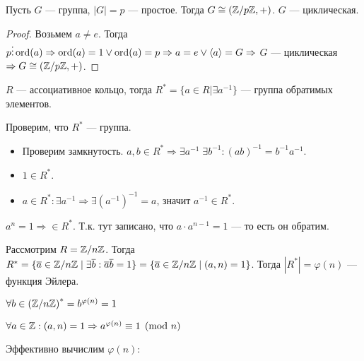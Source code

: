 \begin{remark}
    Пусть $G$ --- группа,  $|G| = p$ --- простое. Тогда  $G \cong (\mathbb{Z} / p\mathbb{Z}, +)$.  $G$ --- циклическая.
\end{remark}
\begin{proof}
    Возьмем $a \neq e$. Тогда  $p \vdots \operatorname{ord}(a) \Rightarrow \operatorname{ord}(a) = 1 \lor \operatorname{ord}(a) = p \Rightarrow a = e \lor \langle a \rangle = G \Rightarrow$
    $G$ --- циклическая  $\Rightarrow G \cong (\mathbb{Z} / p \mathbb{Z}, +)$. 
\end{proof}
\begin{definition}
    $R$ --- ассоциативное кольцо, тогда  $R^* = \{a \in R | \exists a^{-1}\}$ --- группа обратимых элементов.
\end{definition}
Проверим, что $R^*$ --- группа. 
 \begin{itemize}
     \item Проверим замкнутость. $a, b \in R^* \Rightarrow \exists a^{-1}\; \exists b^{-1}: (ab)^{-1} = b^{-1} a^{-1}$.
     \item  $1 \in R^*$. 
     \item $a \in R^*: \exists a^{-1} \Rightarrow \exists \left(a^{-1}\right)^{-1} = a$, значит $a^{-1} \in R^*$. 
\end{itemize}
\begin{remark}
    $a^n = 1 \Rightarrow \in R^*$. Т.к. тут записано, что  $a \cdot a^{n-1} = 1$ --- то есть он обратим.
\end{remark}
\slashn
Рассмотрим $R = \mathbb{Z} / n\mathbb{Z}$. Тогда  $R^* = \{ \overline{a} \in \mathbb{Z} / n\mathbb{Z} \mid \exists \overline{b}: \overline{a} \overline{b} = 1\} = \{\overline{a} \in \mathbb{Z} / n\mathbb{Z} \mid (a, n) = 1\}$. Тогда $|R^*| = \varphi(n)$ --- функция Эйлера.
 \begin{theorem}
     $\forall b \in \left(\mathbb{Z} / n\mathbb{Z}\right)^* = b^{\varphi(n)} = 1$
\end{theorem}
\begin{theorem}
    $\forall a \in \mathbb{Z}: (a, n) = 1 \Rightarrow a^{\varphi(n)} \equiv 1 \pmod{n}$ 
\end{theorem}
\slashn
Эффективно вычислим $\varphi(n)$:
